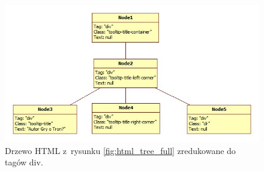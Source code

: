 \documentclass[a4paper,10pt]{article}
\begin{document}
\begin{figure}[h!]
\centering
  \includegraphics[width=\textwidth]{html_tree_cropped.jpg}
  \caption{Drzewo HTML z~rysunku \ref{fig:html_tree_full} zredukowane do tagów div.}
  \label{fig:html_tree_cropped}
\end{figure}
\end{document}
